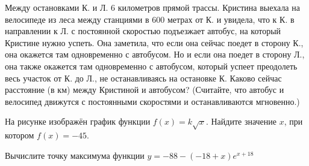 \documentclass[twocolumn]{article}
\begin{document}
\begin{taskBN}{9}
Между остановками К. и Л. 6 километров прямой трассы. Кристина выехала на велосипеде из леса между станциями в 600 метрах от К. и увидела, что к К. в направлении к Л. с постоянной скоростью подъезжает автобус, на который Кристине нужно успеть. Она заметила, что если она сейчас поедет в сторону К., она окажется там одновременно с автобусом. Но и если она поедет в сторону Л., она также окажется там одновременно с автобусом, который успеет преодолеть весь участок от К. до Л., не останавливаясь на остановке К. Каково сейчас расстояние (в км) между Кристиной и автобусом?  (Считайте, что автобус и велосипед движутся с постоянными скоростями и останавливаются мгновенно.)
\end{taskBN}

\begin{taskBN}{10}
На рисунке изображён график функции $f(x)=k\sqrt{x}$. Найдите значение $x$, при котором $f(x)= -45 $. \vspace{2.5cm}
\end{taskBN}

\begin{taskBN}{11}
Вычислите точку максимума функции $y = -88-(-18+x)e^{x+18}$
\end{taskBN}
\end{document}
